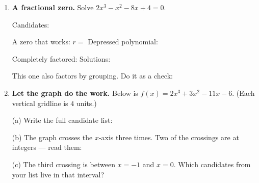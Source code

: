 \documentclass[10pt]{article}
\newcommand{\lgrid}[4]{%
  \draw[step=1, linegray!40, very thin] (#1,#3) grid (#2,#4);
  \draw[->, semithick, charcoal] (#1,0)--(#2,0) node[below right, font=\scriptsize]{$x$};
  \draw[->, semithick, charcoal] (0,#3)--(0,#4) node[left, font=\scriptsize]{$y$};}
\begin{document}
\begin{tcolorbox}[colback=white, colframe=black!40, title=\textbf{Tier A --- Approaching Proficiency},
    fonttitle=\bfseries, arc=1.5mm, left=3mm, right=3mm, top=2mm, bottom=2mm, breakable]
\begin{enumerate}[leftmargin=1.7em, itemsep=10pt]
  \item \textbf{A fractional zero.} Solve $2x^3 - x^2 - 8x + 4 = 0$.

    \vspace{2pt}
    Candidates: 

    \vspace{2pt}
    A zero that works: $r = $  \quad Depressed polynomial: 

    \vspace{2pt}
    Completely factored:  \quad Solutions: 

    \vspace{2pt}
    This one also factors by grouping. Do it as a check:

  \item \textbf{Let the graph do the work.} Below is $f(x) = 2x^3 + 3x^2 - 11x - 6$.
    (Each vertical gridline is $4$ units.)
    \begin{center}
    \end{center}

    \vspace{2pt}
    (a) Write the full candidate list: 

    \vspace{2pt}
    (b) The graph crosses the $x$-axis three times. Two of the crossings are at integers ---
    read them: 

    \vspace{2pt}
    (c) The third crossing is between $x = -1$ and $x = 0$. Which candidates from your list live in
    that interval? 


\end{enumerate}
\end{tcolorbox}
\end{document}
